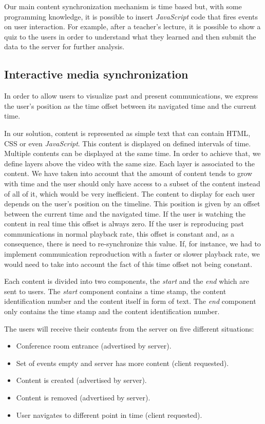 	Our main content synchronization mechanism is time based but, with some programming knowledge, it is possible to insert \emph{JavaScript} code that fires events on user interaction. For example, after a teacher's lecture, it is possible to show a quiz to the users in order to understand what they learned and then submit the data to the server for further analysis.


	\subsection{Interactive media synchronization}

	In order to allow users to visualize past and present communications, we express the user's position as the time offset between its navigated time and the current time.


	In our solution, content is represented as simple text that can contain \ac{HTML}, \ac{CSS} or even \emph{JavaScript}. This content is displayed on defined intervals of time. Multiple contents can be displayed at the same time. In order to achieve that, we define layers above the video with the same size. Each layer is associated to the content.	We have taken into account that the amount of content tends to grow with time and the user should only have access to a subset of the content instead of all of it, which would be very inefficient. The content to display for each user depends on the user's position on the timeline. This position is given by an offset between the current time and the navigated time. If the user is watching the content in real time this offset is always zero. If the user is reproducing past communications in normal playback rate, this offset is constant and, as a consequence, there is need to re-synchronize this value. If, for instance, we had to implement communication reproduction with a faster or slower playback rate, we would need to take into account the fact of this time offset not being constant. 

	Each content is divided into two components, the \emph{start} and the \emph{end} which are sent to users. The \emph{start} component contains a time stamp, the content identification number and the content itself in form of text. The \emph{end} component only contains the time stamp and the content identification number. 

	The users will receive their contents from the server on five different situations:

	\begin{itemize}
		\item Conference room entrance (advertised by server).
		\item Set of events empty and server has more content (client requested).
		\item Content is created (advertised by server).
		\item Content is removed (advertised by server).
		\item User navigates to different point in time (client requested).
	\end{itemize}

